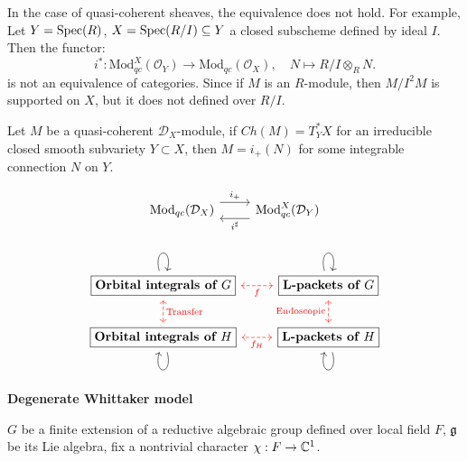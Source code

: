 \begin{rk}
  In the case of quasi-coherent sheaves, the equivalence does not hold. For example, Let $Y = \operatorname{Spec}(R)$, $X = \operatorname{Spec}(R/I) \subseteq Y$ a closed subscheme defined by ideal $I$. Then the functor:
  \[i^* : \mathrm{Mod}^X_{qc}(\mathcal{O}_Y) \to \mathrm{Mod}_{qc}(\mathcal{O}_X), \quad N \mapsto R/I \otimes_R N.\]
  is not an equivalence of categories. Since if $M$ is an $R$-module, then $M/I^2M$ is supported on $X$, but it does not defined over $R/I$.
\end{rk}

\begin{cor}
  Let $M$ be a quasi-coherent $\mathcal{D}_X$-module, if $Ch(M) = T^*_{Y}X$ for an irreducible closed smooth subvariety $Y \subset X$, then $M = i_+(N)$ for some integrable connection $N$ on $Y$.
\end{cor}

\[
\begin{tikzcd}
  \mathrm{Mod}_{qc}(\mathcal{D}_X) \arrow[r,shift left=1.5ex,"i_+"] & \mathrm{Mod}^X_{qc}(\mathcal{D}_Y) \arrow[l,shift left=1.5ex,"i^{\sharp}"]
\end{tikzcd}
\]



\[
\begin{tikzcd}
  \boxed{\textbf{Orbital integrals of $G$}} \arrow[loop above,]{r} \arrow[red,d,dashed,leftrightarrow,"\mathrm{Transfer}"] & \boxed{\textbf{L-packets of $G$}} \arrow[red,l,leftrightarrow,dashed,"f"] \arrow[loop above]{l}\\
  \boxed{\textbf{Orbital integrals of $H$}} \arrow[loop below]{r} & \boxed{\textbf{L-packets of $H$}} \arrow[red,l,leftrightarrow,dashed,"f_H"] \arrow[loop below]{l}
  \arrow[red,u,leftrightarrow,dashed,"{\mathrm{Endoscopic}}"]
\end{tikzcd}
\]



\textbf{Degenerate Whittaker model}

$G$ be a finite extension of a reductive algebraic group defined over local field $F$, $\mathfrak{g}$ be its Lie algebra, fix a nontrivial character $\chi: F \to \mathbb{C}^1$.

